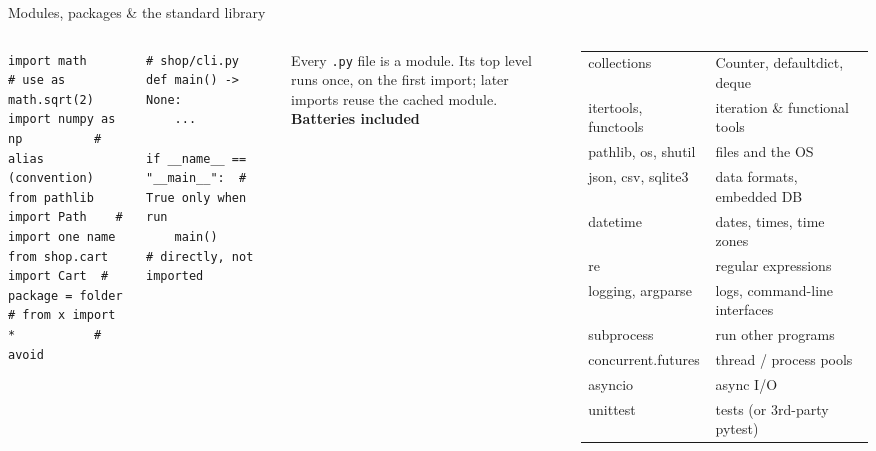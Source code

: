\documentclass[aspectratio=169,9pt]{beamer}
\newcommand{\cc}[1]{\texttt{#1}}                      %
\newcommand{\hint}[1]{{\small\color{ink2}#1}}  %
\newcommand{\head}[1]{{\color{pyblue!80!black}\bfseries #1}\par\vspace{1pt}}
\begin{document}
\begin{frame}[fragile]{Modules, packages \& the standard library}
\begin{columns}[T]
\begin{lstlisting}
import math                 # use as math.sqrt(2)
import numpy as np          # alias (convention)
from pathlib import Path    # import one name
from shop.cart import Cart  # package = folder
# from x import *           # avoid
\end{lstlisting}
\begin{lstlisting}
# shop/cli.py
def main() -> None:
    ...

if __name__ == "__main__":  # True only when run
    main()                  # directly, not imported
\end{lstlisting}
\hint{Every \cc{.py} file is a module. Its top level runs once, on the
first import; later imports reuse the cached module.}
\head{Batteries included}
\footnotesize
\renewcommand{\arraystretch}{1.08}
\begin{tabular}{@{}>{\ttfamily}l l@{}}
\toprule
collections        & Counter, defaultdict, deque \\
itertools, functools & iteration \& functional tools \\
pathlib, os, shutil & files and the OS \\
json, csv, sqlite3 & data formats, embedded DB \\
datetime           & dates, times, time zones \\
re                 & regular expressions \\
logging, argparse  & logs, command-line interfaces \\
subprocess         & run other programs \\
concurrent.futures & thread / process pools \\
asyncio            & async I/O \\
unittest           & tests (or 3rd-party pytest) \\
\bottomrule
\end{tabular}
\end{columns}
\end{frame}
\end{document}
